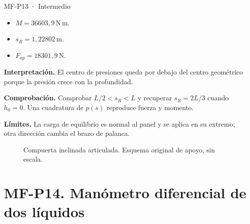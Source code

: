 \begin{studiumworked}{MF-P13 · Intermedio}
\begin{itemize}
\item $M=36603{,}9\,\mathrm{N\,m}$.

\item $s_R=1{,}22802\,\mathrm{m}$.

\item $F_{ap}=18301{,}9\,\mathrm{N}$.

\end{itemize}

\textbf{Interpretación.} El centro de presiones queda por debajo del centro geométrico porque la presión crece con la profundidad.

\textbf{Comprobación.} Comprobar $L/2<s_R<L$ y recuperar $s_R=2L/3$ cuando $h_0=0$. Una cuadratura de $p(s)$ reproduce fuerza y momento.

\textbf{Límites.} La carga de equilibrio es normal al panel y se aplica en su extremo; otra dirección cambia el brazo de palanca.

\end{studiumworked}


\begin{figure}[htbp]\centering{}\caption{Compuerta inclinada articulada. Esquema original de apoyo, sin escala.}\label{fig:mf-p13}\end{figure}


\Needspace{.30\textheight}\section{MF-P14. Manómetro diferencial de dos líquidos}

